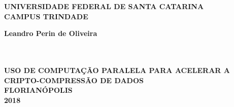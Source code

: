 \thispagestyle{empty}

\vfill
 \begin{center}
    

    {\large\bfseries UNIVERSIDADE FEDERAL DE SANTA CATARINA} \\
    
   
    {\large\bfseries CAMPUS TRINDADE}  \\ 

    \vspace*{1in}
    \begin{large} \bfseries Leandro Perin de Oliveira \end{large}\\[0.4in]

    \vspace*{4cm}
    \noindent \\
    
    \large\bfseries{USO DE COMPUTAÇÃO PARALELA PARA ACELERAR A CRIPTO-COMPRESSÃO DE DADOS} \\
    \vfill
    \large\bfseries{ FLORIANÓPOLIS \\ 2018}
\end{center}

\normalsize


